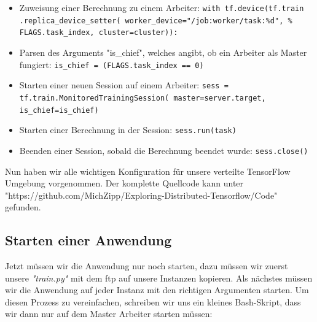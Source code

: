 \begin{itemize}
	\item Zuweisung einer Berechnung zu einem Arbeiter: \newline
		\texttt{with tf.device(tf.train \newline
			\hspace*{5mm} .replica\_device\_setter(
			\hspace*{5mm} worker\_device="/job:worker/task:\%d",\newline
			\hspace*{5mm} \% FLAGS.task\_index, cluster=cluster)):}
	\item Parsen des Arguments "is\_chief", welches angibt, ob ein Arbeiter als Master fungiert: \newline
		\texttt{is\_chief = (FLAGS.task\_index == 0)}
	\item Starten einer neuen Session auf einem Arbeiter: \newline
		\texttt{sess = tf.train.MonitoredTrainingSession(
			master=server.target,
			is\_chief=is\_chief)}
	\item Starten einer Berechnung in der Session: \newline
		\texttt{sess.run(task)}
	\item Beenden einer Session, sobald die Berechnung beendet wurde: \newline
		\texttt{sess.close()}
\end{itemize}

Nun haben wir alle wichtigen Konfiguration für unsere verteilte TensorFlow Umgebung vorgenommen. Der komplette Quellcode kann unter "https://github.com/MichZipp/Exploring-Distributed-Tensorflow/Code" gefunden. 

\subsection{Starten einer Anwendung}
Jetzt müssen wir die Anwendung nur noch starten, dazu müssen wir zuerst unsere \textit{"train.py"} mit dem \ac{ftp} auf unsere Instanzen kopieren. Als nächstes müssen wir die Anwendung auf jeder Instanz mit den richtigen Argumenten starten. Um diesen Prozess zu vereinfachen, schreiben wir uns ein kleines Bash-Skript, dass wir dann nur auf dem Master Arbeiter starten müssen:

